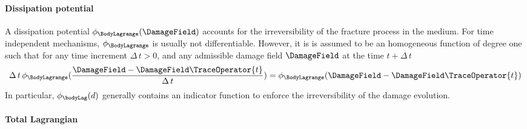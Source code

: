 \paragraph{Dissipation potential}

A dissipation potential $\phi_{\BodyLagrange}(\DamageField)$ accounts for the irreversibility of the fracture process in the medium.
For time independent mechanisms, $\phi_{\BodyLagrange}$ is usually not differentiable. However, it is is assumed to be
an homogeneous function of degree one
such that for any time increment $\Delta \, t > 0$, and any admissible damage field $\DamageField$ at the time $t + \Delta \, t$
%
%
%
\begin{equation}
  \label{eq:ef_micromorphic:formulation:dissipation_potential}
  \begin{aligned}
      \Delta \, t \, \phi_{\BodyLagrange}(\frac{\DamageField - \DamageField \TraceOperator{t}} {\Delta \, t})
      =
      \phi_{\BodyLagrange}(\DamageField - \DamageField \TraceOperator{t})
  \end{aligned}
\end{equation}
%
%
%
In particular, $\phi_{\bodyLag}(d)$ generally contains an indicator function to enforce the irreversibility of the
damage evolution.

\paragraph{Total Lagrangian}

